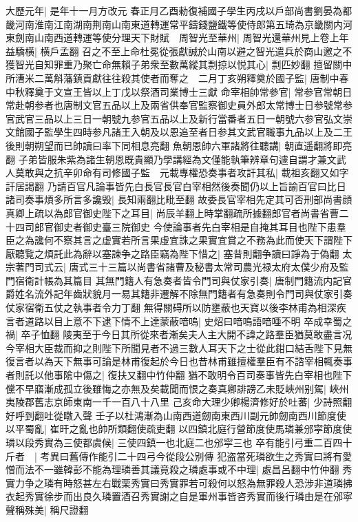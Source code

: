 大歷元年|{
	是年十一月方改元}
春正月乙酉勑復補國子學生丙戌以戶部尚書劉晏為都畿河南淮南江南湖南荆南山南東道轉運常平鑄錢鹽鐵等使侍郎第五琦為京畿關内河東劍南山南西道轉運等使分理天下財賦　周智光至華州|{
	周智光還華州見上卷上年}
益驕横|{
	横戶孟翻}
召之不至上命杜冕從張獻誠於山南以避之智光遣兵於商山邀之不獲智光自知罪重乃聚亡命無賴子弟衆至數萬縱其剽掠以悦其心|{
	剽匹妙翻}
擅留關中所漕米二萬斛藩鎮貢獻往往殺其使者而奪之　二月丁亥朔釋奠於國子監|{
	唐制中春中秋釋奠于文宣王皆以上丁戊以祭酒司業博士三獻}
命宰相帥常參官|{
	常参官常朝日常赴朝参者也唐制文官五品以上及兩省供奉官監察御史員外郎太常博士日参號常参官武官三品以上三日一朝號九参官五品以上及新行當番者五日一朝號六参官弘文崇文館國子監學生四時参凡諸王入朝及以恩追至者日参其文武官職事九品以上及二王後則朝朔望而已帥讀曰率下同相息亮翻}
魚朝恩帥六軍諸將往聽講|{
	朝直遥翻將即亮翻}
子弟皆服朱紫為諸生朝恩既貴顯乃學講經為文僅能執筆辨章句遽自謂才兼文武人莫敢與之抗辛卯命有司修國子監　元載專權恐奏事者攻訐其私|{
	載祖亥翻又如字訐居謁翻}
乃請百官凡論事皆先白長官長官白宰相然後奏聞仍以上旨諭百官曰比日諸司奏事煩多所言多讒毁|{
	長知兩翻比毗至翻}
故委長官宰相先定其可否刑部尚書顔真卿上疏以為郎官御史陛下之耳目|{
	尚辰羊翻上時掌翻疏所據翻郎官者尚書省曹二十四司郎官御史者御史臺三院御史}
今使論事者先白宰相是自掩其耳目也陛下患羣臣之為讒何不察其言之虚實若所言果虛宜誅之果實宜賞之不務為此而使天下謂陛下厭聽覧之煩託此為辭以塞諫争之路臣竊為陛下惜之|{
	塞昔則翻争讀曰諍為于偽翻}
太宗著門司式云|{
	唐式三十三篇以尚書省諸曹及秘書太常司農光禄太府太僕少府及監門宿衛計帳為其篇目}
其無門籍人有急奏者皆令門司與仗家引奏|{
	唐制門籍流内記官爵姓名流外記年齒狀貌月一易其籍非遷解不除無門籍者有急奏則令門司與仗家引奏仗家宿衛五仗之執事者令力丁翻}
無得關碍所以防壅蔽也天寶以後李林甫為相深疾言者道路以目上意不下逮下情不上達蒙蔽喑嗚|{
	史炤曰喑嗚語喑唖不明}
卒成幸蜀之禍|{
	卒子恤翻}
陵夷至于今日其所從來者漸矣夫人主大開不諱之路羣臣猶莫敢盡言况今宰相大臣裁而抑之則陛下所聞見者不過三數人耳天下之士從此鉗口結舌陛下見無復言者以為天下無事可論是林甫復起於今日也昔林甫雖擅權羣臣有不諮宰相輒奏事者則託以他事隂中傷之|{
	復扶又翻中竹仲翻}
猶不敢明令百司奏事皆先白宰相也陛下儻不早寤漸成孤立後雖悔之亦無及矣載聞而恨之奏真卿誹謗乙未貶峽州别駕|{
	峽州夷陵郡舊志京師東南一千一百八十八里}
己亥命大理少卿楊濟修好於吐蕃|{
	少詩照翻好呼到翻吐從暾入聲}
壬子以杜鴻漸為山南西道劒南東西川副元帥劒南西川節度使以平蜀亂|{
	崔旰之亂也帥所類翻使疏吏翻}
以四鎮北庭行營節度使馬璘兼邠寜節度使璘以段秀實為三使都虞候|{
	三使四鎮一也北庭二也邠寜三也}
卒有能引弓重二百四十斤者　|{
	考異曰舊傳作能引二十四弓今從段公别傳}
犯盗當死璘欲生之秀實曰將有愛憎而法不一雖韓彭不能為理璘善其議竟殺之璘處事或不中理|{
	處昌呂翻中竹仲翻}
秀實力争之璘有時怒甚左右戰栗秀實曰秀實罪若可殺何以怒為無罪殺人恐涉非道璘拂衣起秀實徐步而出良久璘置酒召秀實謝之自是軍州事皆咨秀實而後行璘由是在邠寜聲稱殊美|{
	稱尺證翻}
